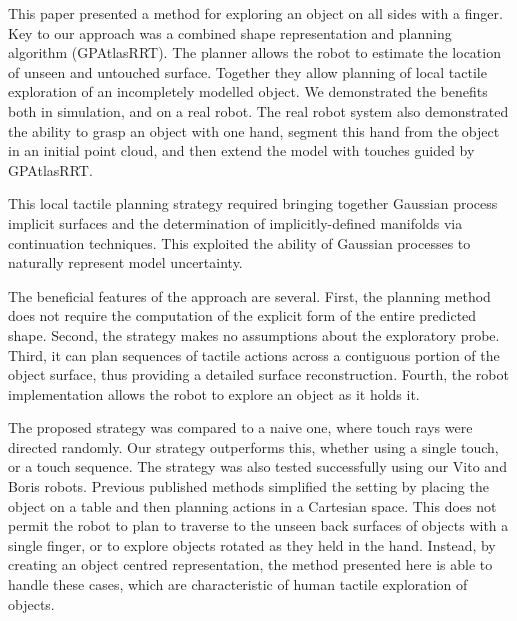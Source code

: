 This paper presented a method for exploring an object on all sides with a finger. Key to our approach was a combined shape representation and planning algorithm (GPAtlasRRT). The planner allows the robot to estimate the location of unseen and untouched surface. Together they allow planning of local tactile exploration of an incompletely modelled object. We demonstrated the benefits both in simulation, and on a real robot. The real robot system also demonstrated the ability to grasp an object with one hand, segment this hand from the object in an initial point cloud, and then extend the model with touches guided by GPAtlasRRT.

This local tactile planning strategy required bringing together Gaussian process implicit surfaces and the determination of implicitly-defined manifolds via continuation techniques. This exploited the ability of Gaussian processes to naturally represent model uncertainty. 

The beneficial features of the approach are several. First, the planning method does not require the computation of the explicit form of the entire predicted shape. Second, the strategy makes no assumptions about the exploratory probe. Third, it can plan sequences of tactile actions across a contiguous portion of the object surface, thus providing a detailed surface reconstruction. Fourth, the robot implementation allows the robot to explore an object as it holds it.

The proposed strategy was compared to a naive one, where touch rays were directed randomly. Our strategy outperforms this, whether using a single touch, or a touch sequence. The strategy was also tested successfully using our Vito and Boris robots. Previous published methods simplified the setting by placing the object on a table and then planning actions in a Cartesian space. This does not permit the robot to plan to traverse to the unseen back surfaces of objects with a single finger, or to explore objects rotated as they held in the hand. Instead, by creating an object centred representation, the method presented here is able to handle these cases, which are characteristic of human tactile exploration of objects.

